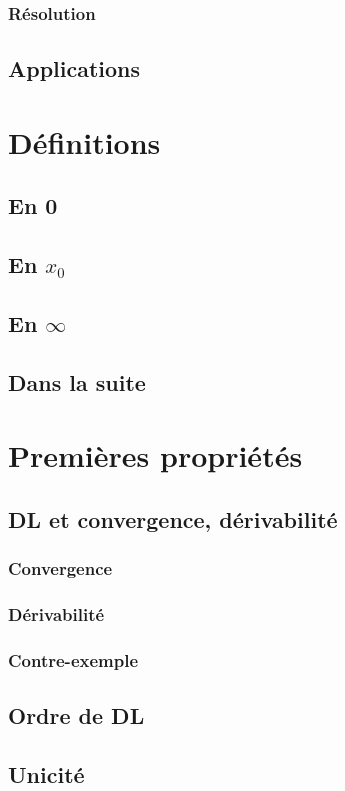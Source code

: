 \documentclass[12pt,a4paper,french]{book}
\begin{document}
			\subsubsection{Résolution}
		\subsection{Applications}
	\section{Définitions}
		\subsection{En 0}
		\subsection{En $x_0$}
		\subsection{En $\infty$}
		\subsection{Dans la suite}
	\section{Premières propriétés}
		\subsection{DL et convergence, dérivabilité}
			\subsubsection{Convergence}
			\subsubsection{Dérivabilité}
			\subsubsection{Contre-exemple}
		\subsection{Ordre de DL}
		\subsection{Unicité}
\end{document}
